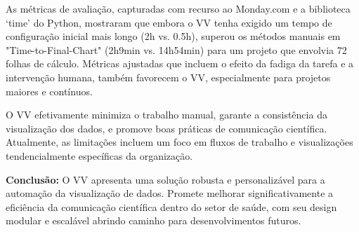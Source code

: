 As métricas de avaliação, capturadas com recurso ao Monday.com e a
biblioteca `time' do Python, mostraram que embora o VV tenha exigido um
tempo de configuração inicial mais longo (2h vs. 0.5h), superou os
métodos manuais em "Time-to-Final-Chart" (2h9min vs. 14h54min) para um
projeto que envolvia 72 folhas de cálculo. Métricas ajustadas que
incluem o efeito da fadiga da tarefa e a intervenção humana, também
favorecem o VV, especialmente para projetos maiores e contínuos.

O VV efetivamente minimiza o trabalho manual, garante a consistência da
visualização dos dados, e promove boas práticas de comunicação
científica. Atualmente, as limitações incluem um foco em fluxos de
trabalho e visualizações tendencialmente específicas da organização.

\textbf{Conclusão:} O VV apresenta uma solução robusta e personalizável para a automação da
visualização de dados. Promete melhorar significativamente a eficiência
da comunicação científica dentro do setor de saúde, com seu design
modular e escalável abrindo caminho para desenvolvimentos futuros.
